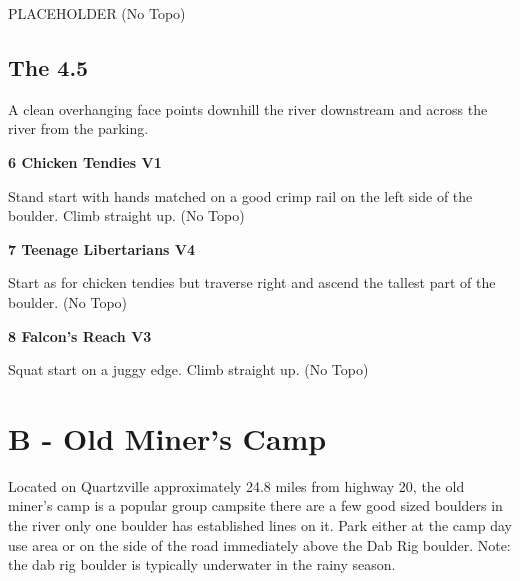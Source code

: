 \begin{multicols}{2}
			\begin{adjustwidth}{0.5cm}{}				
			PLACEHOLDER
				\newline (No Topo) 
			\end{adjustwidth}
		\subsection*{The 4.5}\label{bf:The 4.5}
		A clean overhanging face points downhill the river downstream and across the river from the parking.\\
	
			\label{rt:Chicken Tendies}
\colorbox{green!20}{
\parbox{0.95\linewidth}{
\textbf{
6 Chicken Tendies V1  
}
}
}

			\begin{adjustwidth}{0.5cm}{}				
			Stand start with hands matched on a good crimp rail on the left side of the boulder. Climb straight up.
				\newline (No Topo) 
			\end{adjustwidth}
			\label{rt:Teenage Libertarians}
\colorbox{RoyalBlue!20}{
\parbox{0.95\linewidth}{
\textbf{
7 Teenage Libertarians V4  
}
}
}

			\begin{adjustwidth}{0.5cm}{}				
			Start as for chicken tendies but traverse right and ascend the tallest part of the boulder.
				\newline (No Topo) 
			\end{adjustwidth}
			\label{rt:Falcon's Reach}
\colorbox{green!20}{
\parbox{0.95\linewidth}{
\textbf{
8 Falcon's Reach V3  
}
}
}

			\begin{adjustwidth}{0.5cm}{}				
			Squat start on a juggy edge. Climb straight up.
				\newline (No Topo) 
			\end{adjustwidth}
\newpage
		\section{B - Old Miner's Camp}\label{sa:Old Miner's Camp}
	Located on Quartzville approximately 24.8 miles from highway 20, the old miner's camp is a popular group campsite there are a few good sized boulders in the river only one boulder has established lines on it. Park either at the camp day use area or on the side of the road immediately above the Dab Rig boulder. Note: the dab rig boulder is typically underwater in the rainy season.\\


\end{multicols}
